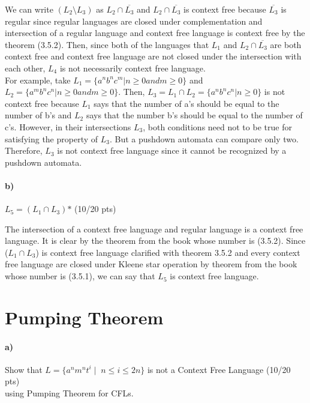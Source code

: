 \documentclass[a4paper,12pt]{article}
\begin{document}
\begin{tcolorbox}
We can write $(L_2 \setminus L_3) $ as $L_2 \cap \overline{L_3}$ and $L_2 \cap \overline{L_3}$ is context free because $\overline{L_3}$ is regular since regular languages are closed under complementation and intersection of a regular language and context free language is context free by the theorem (3.5.2). Then, since both of the languages that $L_1$ and $L_2 \cap \overline{L_3}$ are both context free and context free language are not closed under the intersection with each other, $L_4$ is not necessarily context free language. \\ For example, take $L_1 = \{ a^nb^nc^m | n \geq 0 and m \geq 0\}$ and $L_2 = \{a^mb^nc^n | n \geq 0 and m \geq 0  \}$. Then, $L_3 = L_1 \cap L_2 = \{a^nb^nc^n | n \geq 0\}$ is not context free because $L_1$ says that the number of a's should be equal to the number of b's and $L_2$ says that the number b's should be equal to the number of c's. However, in their intersections $L_3$, both conditions need not to be true for satisfying the property of $L_3$. But a pushdown automata can compare only two. Therefore, $L_3$ is not context free language since it cannot be recognized by a pushdown automata.
\end{tcolorbox}

\paragraph{b)} $L_5 = (L_1 \cap L_3)\text{*}$ \hfill \small{(10/20 pts)} \\

\begin{tcolorbox}
The intersection of a context free language and regular language is a context free language. It is clear by the theorem from the book whose number is (3.5.2). Since ($L_1 \cap L_3$) is context free language clarified with theorem 3.5.2 and every context free language are closed under Kleene star operation by theorem from the book whose number is (3.5.1), we can say that $L_5$ is context free language.
\end{tcolorbox}





\newpage
\section{Pumping Theorem \hfill {}}

\paragraph{a)} Show that $L=\{a^n m^n t^i \mid \; n\leq i \leq 2n\}$ is not a Context Free Language \hfill \small{(10/20 pts)} \\
using Pumping Theorem for CFLs. \\
\end{document}
